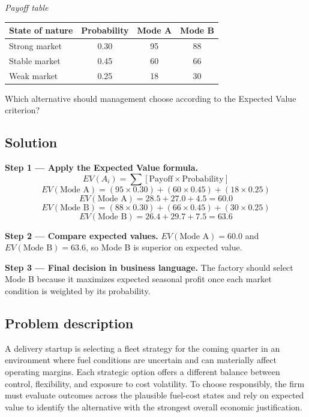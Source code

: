 \begin{ExamProblems}
		\begin{center}
			\textit{Payoff table} \par
			\begin{tabular}{l c c c}
				\toprule
				State of nature & Probability & Mode A & Mode B \\
				\midrule
				Strong market & 0.30 & 95 & 88 \\
				Stable market & 0.45 & 60 & 66 \\
				Weak market & 0.25 & 18 & 30 \\
				\bottomrule
			\end{tabular}
		\end{center}

		Which alternative should management choose according to the Expected Value criterion?

		\subsection*{Solution}
		\textbf{Step 1 --- Apply the Expected Value formula.}
		\[
		EV(A_i)=\sum [\text{Payoff}\times\text{Probability}]
		\]
		\[
		EV(\text{Mode A})=(95\times0.30)+(60\times0.45)+(18\times0.25)
		\]
		\[
		EV(\text{Mode A})=28.5+27.0+4.5=60.0
		\]
		\[
		EV(\text{Mode B})=(88\times0.30)+(66\times0.45)+(30\times0.25)
		\]
		\[
		EV(\text{Mode B})=26.4+29.7+7.5=63.6
		\]
		
		\textbf{Step 2 --- Compare expected values.}
		$EV(\text{Mode A})=60.0$ and $EV(\text{Mode B})=63.6$, so Mode B is superior on expected value.
		
		\textbf{Step 3 --- Final decision in business language.}
		The factory should select Mode B because it maximizes expected seasonal profit once each market condition is weighted by its probability.		\item
		\subsection*{Problem description}
		A delivery startup is selecting a fleet strategy for the coming quarter in an environment where fuel conditions are uncertain and can materially affect operating margins. Each strategic option offers a different balance between control, flexibility, and exposure to cost volatility. To choose responsibly, the firm must evaluate outcomes across the plausible fuel-cost states and rely on expected value to identify the alternative with the strongest overall economic justification.


\end{ExamProblems}
